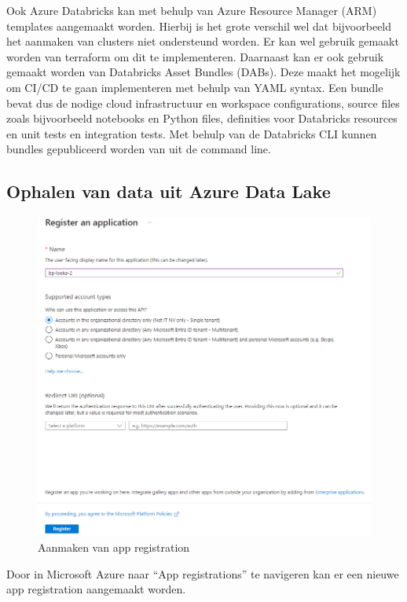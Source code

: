 Ook Azure Databricks kan met behulp van Azure Resource Manager (ARM) templates aangemaakt worden. Hierbij is het grote verschil wel dat bijvoorbeeld het aanmaken van clusters niet ondersteund worden. Er kan wel gebruik gemaakt worden van terraform om dit te implementeren. Daarnaast kan er ook gebruik gemaakt worden van Databricks Asset Bundles (DABs). Deze maakt het mogelijk om CI/CD te gaan implementeren met behulp van YAML syntax. Een bundle bevat dus de nodige cloud infrastructuur en workspace configurations, source files zoals bijvoorbeeld notebooks en Python files, definities voor Databricks resources en unit tests en integration tests. Met behulp van de Databricks CLI kunnen bundles gepubliceerd worden van uit de command line. 

\subsection{Ophalen van data uit Azure Data Lake}
\label{sec:ophalen}

\begin{figure}[H]
    \centering
    \includegraphics[width=1\textwidth]{./graphics/databricks/connection_2.png}
    \caption{Aanmaken van app registration}
\end{figure}

Door in Microsoft Azure naar ``App registrations'' te navigeren kan er een nieuwe app registration aangemaakt worden.

